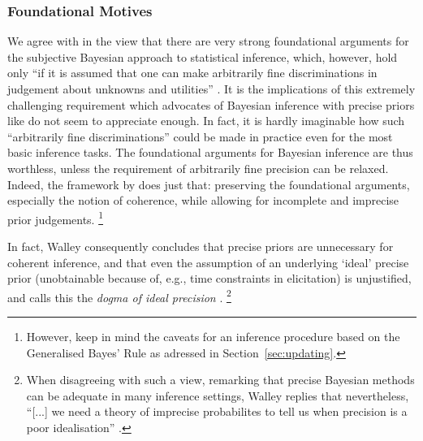 \subsubsection{Foundational Motives}
\label{sec:motivation:bayesian-foundational}

We agree with \textcite[\S 1.1]{1994:berger} in the view that there are very strong foundational arguments
for the subjective Bayesian approach to statistical inference, which, however, hold only
``if it is assumed that one can make arbitrarily fine discriminations
in judgement about unknowns and utilities'' \parencite[p.~303]{1994:berger}. 
It is the implications of this extremely challenging requirement
which advocates of Bayesian inference with precise priors
like \textcite{1987:lindley} do not seem to appreciate enough.
In fact, it is hardly imaginable how such ``arbitrarily fine discriminations''
could be made in practice even for the most basic inference tasks.
The foundational arguments for Bayesian inference are thus worthless,
unless the requirement of arbitrarily fine precision can be relaxed.
Indeed, the framework by \textcite{1991:walley} does just that:
preserving the foundational arguments, especially the notion of coherence,
while allowing for incomplete and imprecise prior judgements.%
\footnote{However, keep in mind the caveats for an inference procedure based on the Generalised Bayes' Rule
as adressed in Section~\ref{sec:updating}.}

In fact, Walley consequently concludes that precise priors are unnecessary for coherent inference,
and that even the assumption of an underlying `ideal' precise prior
(unobtainable because of, e.g., time constraints in elicitation) is unjustified, %
and calls this the \emph{dogma of ideal precision} \parencite[\S 5.9]{1991:walley}.%
\footnote{When disagreeing with such a view, remarking that
precise Bayesian methods can be adequate in many inference settings,
Walley replies that nevertheless,
``[...] we need a theory of imprecise probabilites to tell us when precision is a poor idealisation''
\parencite[\S 5.8.1, item~3, p.~250]{1991:walley}.}

